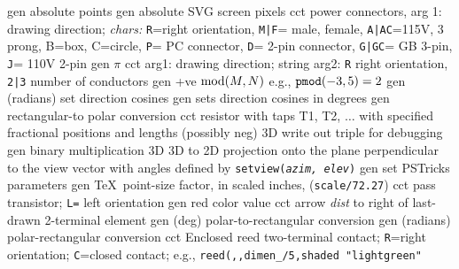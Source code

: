   {gen}
  {absolute points}
  {gen}
  {absolute SVG screen pixels}
  {cct}
  {power connectors, arg 1: drawing direction; {\sl chars:}
   {\tt R}=right orientation,
   {\tt M|F}= male, female,
   {\tt A|AC}=115V, 3 prong, B=box, C=circle,
   {\tt P}= PC connector,
   {\tt D}= 2-pin connector,
   {\tt G|GC}= GB 3-pin,
   {\tt J}= 110V 2-pin
    }
  {gen}
  {$\pi$}
  {cct}
  {arg1: drawing direction; string arg2: {\tt R} right orientation,
   {\tt 2|3} number of conductors
   }
  {gen}
  {+ve $\hbox{mod}(M,N)$ e.g., $\hbox{\tt pmod}(-3,5)=2$}
  {gen}
  {(radians) set direction cosines}
  {gen}
  {sets direction cosines in degrees }
  {gen}
  {rectangular-to polar conversion}
  {cct}
  {resistor with taps T1, T2, $\ldots$
    with specified fractional positions and lengths (possibly neg) 
   }
  {3D}
  {write out triple for debugging}
  {gen}
  {binary multiplication}
  {3D}
  {3D to 2D projection onto the plane perpendicular to the view vector with
   angles defined by {\tt setview({\sl azim, elev})}}
  {gen}
  {set PSTricks parameters}
  {gen}
  {\TeX\ point-size factor, in scaled inches, ({\tt *scale/72.27})}
  {cct}
  {pass transistor; {\tt L=} left orientation
    }
  {gen}
  {red color value}
  {cct}
  {arrow {\sl dist} to right of last-drawn 2-terminal element
   }
  {gen}
  {(deg) polar-to-rectangular conversion}
  {gen}
  {(radians) polar-rectangular conversion}
  {cct}
  {Enclosed reed two-terminal contact;
   {\tt R}=right orientation; {\tt C}=closed contact;
   e.g., {\tt reed(,,dimen\_/5,shaded "lightgreen"}
   }
